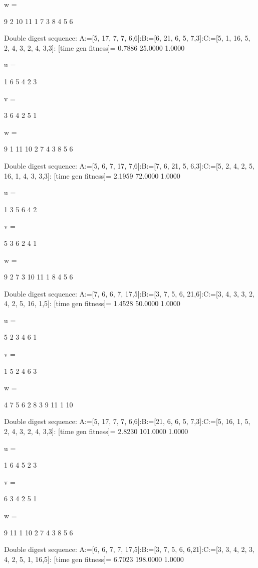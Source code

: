 w =

     9     2    10    11     1     7     3     8     4     5     6

Double digest sequence:
A:=[5, 17, 7, 7, 6,6]:B:=[6, 21, 6, 5, 7,3]:C:=[5, 1, 16, 5, 2, 4, 3, 2, 4, 3,3]:
[time gen fitness]=
    0.7886   25.0000    1.0000


u =

     1     6     5     4     2     3


v =

     3     6     4     2     5     1


w =

     9     1    11    10     2     7     4     3     8     5     6

Double digest sequence:
A:=[5, 6, 7, 17, 7,6]:B:=[7, 6, 21, 5, 6,3]:C:=[5, 2, 4, 2, 5, 16, 1, 4, 3, 3,3]:
[time gen fitness]=
    2.1959   72.0000    1.0000


u =

     1     3     5     6     4     2


v =

     5     3     6     2     4     1


w =

     9     2     7     3    10    11     1     8     4     5     6

Double digest sequence:
A:=[7, 6, 6, 7, 17,5]:B:=[3, 7, 5, 6, 21,6]:C:=[3, 4, 3, 3, 2, 4, 2, 5, 16, 1,5]:
[time gen fitness]=
    1.4528   50.0000    1.0000


u =

     5     2     3     4     6     1


v =

     1     5     2     4     6     3


w =

     4     7     5     6     2     8     3     9    11     1    10

Double digest sequence:
A:=[5, 17, 7, 7, 6,6]:B:=[21, 6, 6, 5, 7,3]:C:=[5, 16, 1, 5, 2, 4, 3, 2, 4, 3,3]:
[time gen fitness]=
    2.8230  101.0000    1.0000


u =

     1     6     4     5     2     3


v =

     6     3     4     2     5     1


w =

     9    11     1    10     2     7     4     3     8     5     6

Double digest sequence:
A:=[6, 6, 7, 7, 17,5]:B:=[3, 7, 5, 6, 6,21]:C:=[3, 3, 4, 2, 3, 4, 2, 5, 1, 16,5]:
[time gen fitness]=
    6.7023  198.0000    1.0000


